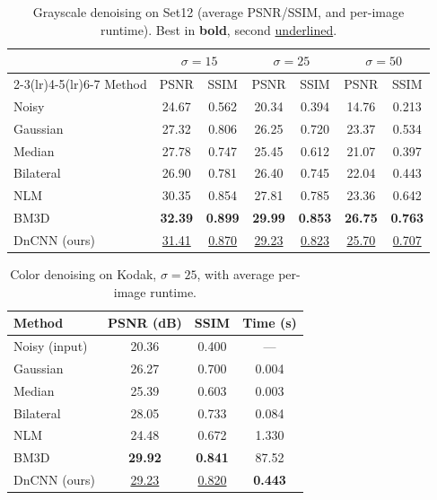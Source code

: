 \documentclass[conference]{IEEEtran}
\begin{document}
\begin{table}[t]
\caption{Grayscale denoising on Set12 (average PSNR/SSIM, and per-image runtime).
Best in \textbf{bold}, second \underline{underlined}.}
\label{tab:gray}
\centering
\setlength{\tabcolsep}{4pt}
\begin{tabular}{lcccccc}
\toprule
& \multicolumn{2}{c}{$\sigma=15$} & \multicolumn{2}{c}{$\sigma=25$} & \multicolumn{2}{c}{$\sigma=50$} \\
\cmidrule(lr){2-3}\cmidrule(lr){4-5}\cmidrule(lr){6-7}
Method & PSNR & SSIM & PSNR & SSIM & PSNR & SSIM \\
\midrule
Noisy        & 24.67 & 0.562 & 20.34 & 0.394 & 14.76 & 0.213 \\
Gaussian     & 27.32 & 0.806 & 26.25 & 0.720 & 23.37 & 0.534 \\
Median       & 27.78 & 0.747 & 25.45 & 0.612 & 21.07 & 0.397 \\
Bilateral    & 26.90 & 0.781 & 26.40 & 0.745 & 22.04 & 0.443 \\
NLM          & 30.35 & 0.854 & 27.81 & 0.785 & 23.36 & 0.642 \\
BM3D         & \textbf{32.39} & \textbf{0.899} & \textbf{29.99} & \textbf{0.853} & \textbf{26.75} & \textbf{0.763} \\
DnCNN (ours) & \underline{31.41} & \underline{0.870} & \underline{29.23} & \underline{0.823} & \underline{25.70} & \underline{0.707} \\
\bottomrule
\end{tabular}
\end{table}

\begin{table}[t]
\caption{Color denoising on Kodak, $\sigma=25$, with average per-image runtime.}
\label{tab:color}
\centering
\begin{tabular}{lccc}
\toprule
Method & PSNR (dB) & SSIM & Time (s) \\
\midrule
Noisy (input) & 20.36 & 0.400 & --- \\
Gaussian      & 26.27 & 0.700 & 0.004 \\
Median        & 25.39 & 0.603 & 0.003 \\
Bilateral     & 28.05 & 0.733 & 0.084 \\
NLM           & 24.48 & 0.672 & 1.330 \\
BM3D          & \textbf{29.92} & \textbf{0.841} & 87.52 \\
DnCNN (ours)  & \underline{29.23} & \underline{0.820} & \textbf{0.443} \\
\bottomrule
\end{tabular}
\end{table}
\end{document}
